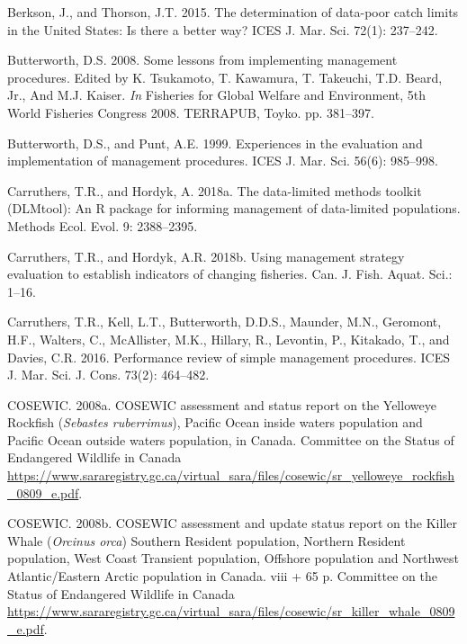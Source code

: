 \documentclass[11pt]{book}
\begin{document}
\leavevmode\hypertarget{ref-berkson2015}{}%
Berkson, J., and Thorson, J.T. 2015. The determination of data-poor catch limits in the United States: Is there a better way? ICES J. Mar. Sci. 72(1): 237--242.

\leavevmode\hypertarget{ref-butterworth2008}{}%
Butterworth, D.S. 2008. Some lessons from implementing management procedures. Edited by K. Tsukamoto, T. Kawamura, T. Takeuchi, T.D. Beard, Jr., And M.J. Kaiser. \emph{In} Fisheries for Global Welfare and Environment, 5th World Fisheries Congress 2008. TERRAPUB, Toyko. pp. 381--397.

\leavevmode\hypertarget{ref-butterworth1999}{}%
Butterworth, D.S., and Punt, A.E. 1999. Experiences in the evaluation and implementation of management procedures. ICES J. Mar. Sci. 56(6): 985--998.

\leavevmode\hypertarget{ref-carruthers2018}{}%
Carruthers, T.R., and Hordyk, A. 2018a. The data-limited methods toolkit (DLMtool): An R package for informing management of data-limited populations. Methods Ecol. Evol. 9: 2388--2395.

\leavevmode\hypertarget{ref-carruthers_hordyk_2018}{}%
Carruthers, T.R., and Hordyk, A.R. 2018b. Using management strategy evaluation to establish indicators of changing fisheries. Can. J. Fish. Aquat. Sci.: 1--16.

\leavevmode\hypertarget{ref-carruthers2016}{}%
Carruthers, T.R., Kell, L.T., Butterworth, D.D.S., Maunder, M.N., Geromont, H.F., Walters, C., McAllister, M.K., Hillary, R., Levontin, P., Kitakado, T., and Davies, C.R. 2016. Performance review of simple management procedures. ICES J. Mar. Sci. J. Cons. 73(2): 464--482.

\leavevmode\hypertarget{ref-cosewic2008}{}%
COSEWIC. 2008a. COSEWIC assessment and status report on the Yelloweye Rockfish (\emph{Sebastes ruberrimus}), Pacific Ocean inside waters population and Pacific Ocean outside waters population, in Canada. Committee on the Status of Endangered Wildlife in Canada \url{https://www.sararegistry.gc.ca/virtual_sara/files/cosewic/sr_yelloweye_rockfish_0809_e.pdf}.

\leavevmode\hypertarget{ref-cosewic2008b}{}%
COSEWIC. 2008b. COSEWIC assessment and update status report on the Killer Whale (\emph{Orcinus orca}) Southern Resident population, Northern Resident population, West Coast Transient population, Offshore population and Northwest Atlantic/Eastern Arctic population in Canada. viii + 65 p. Committee on the Status of Endangered Wildlife in Canada \url{https://www.sararegistry.gc.ca/virtual_sara/files/cosewic/sr_killer_whale_0809_e.pdf}.
\end{document}

